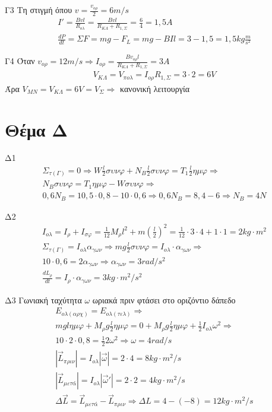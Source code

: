 \documentclass[greek]{beamer}
\begin{document}
\begin{frame}{Γ3}
 Τη στιγμή όπου $v=\frac{v_{ορ}}{2}=6m/s$
 \begin{gather*}
  I'=\frac{Bvl}{R_{ολ}}=\frac{Bvl}{R_{ΚΛ}+R_{1,Σ}}=\frac{6}{4}=1,5A \\
  \frac{dP}{dt}=ΣF=mg-F_L=mg-BIl=3-1,5=1,5kg\frac{m}{s^2}
 \end{gather*}

\end{frame}

\begin{frame}{Γ4}
 Όταν $v_{ορ}=12m/s\Rightarrow I_{ορ}=\frac{Bv_{ορ}l}{R_{ΚΛ}+R_{1,Σ}}=3A$
 \begin{gather*}
  V_{ΚΛ}=V_{πολ}=I_{ορ}R_{1,Σ}=3\cdot 2=6V
 \end{gather*}
 Άρα $V_{ΜΝ}=V_{ΚΛ}=6V=V_Σ\Rightarrow$ κανονική λειτουργία
\end{frame}

\section{Θέμα Δ}
\begin{frame}{Δ1}
 \begin{gather*}
  Σ_{τ(Γ)}=0\Rightarrow W\frac{l}{2}συνφ+N_B\frac{l}{2}συνφ=T_1\frac{l}{2}ημφ \Rightarrow \\
  N_Bσυνφ=T_1ημφ-Wσυνφ \Rightarrow \\
  0,6N_B=10,5\cdot 0,8-10\cdot 0,6 \Rightarrow 0,6N_B=8,4-6\Rightarrow N_B=4N
 \end{gather*}
\end{frame}

\begin{frame}{Δ2}
 \begin{gather*}
  I_{ολ}=I_{ρ}+I_{σφ}=\frac{1}{12}M_ρl^2+m\left(\frac{l}{2}\right)^2=\frac{1}{12}\cdot 3\cdot 4 + 1\cdot 1=2kg\cdot m^2 \\
  Σ_{τ(Γ)}=I_{ολ}α_{γων}\Rightarrow mg\frac{l}{2}συνφ=I_{ολ}\cdot α_{γων}\Rightarrow \\
  10\cdot 0,6=2α_{γων}\Rightarrow α_{γων}=3rad/s^2 \\
  \frac{dL_ρ}{dt}=I_ρ\cdot α_{γων}=3kg\cdot m^2/s^2
 \end{gather*}
\end{frame}

\begin{frame}{Δ3}
Γωνιακή ταχύτητα $ω$ ωριακά πριν φτάσει στο οριζόντιο δάπεδο
 \begin{gather*}
    E_{ολ(αρχ)}=E_{ολ(τελ)}\Rightarrow \\
    mglημφ+M_ρg\frac{l}{2}ημφ=0+M_ρg\frac{l}{2}ημφ+\frac{1}{2}I_{ολ}ω^2\Rightarrow \\
    10\cdot 2\cdot 0,8=\frac{1}{2}2ω^2\Rightarrow ω=4rad/s \\
    |\overrightarrow{L}_{πριν}|=I_{ολ}|\overrightarrow{ω}|=2\cdot 4=8kg\cdot m^2/s \\
    |\overrightarrow{L}_{μετά}|=I_{ολ}|\overrightarrow{ω}'|=2\cdot 2=4kg\cdot m^2/s \\
    Δ\overrightarrow{L}=\overrightarrow{L}_{μετά}-\overrightarrow{L}_{πριν}\Rightarrow ΔL=4-(-8)=12kg\cdot m^2/s
 \end{gather*}
\end{frame}
\end{document}
